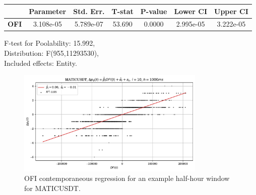 \begin{table}
\begin{center}
\begin{tabular}{lclc}
\hline
\end{tabular}
\begin{tabular}{lcccccc}
             & \textbf{Parameter} & \textbf{Std. Err.} & \textbf{T-stat} & \textbf{P-value} & \textbf{Lower CI} & \textbf{Upper CI}  \\
\hline
\textbf{OFI} &     3.108e-05      &     5.789e-07      &      53.690     &      0.0000      &     2.995e-05     &     3.222e-05      \\
\hline
\end{tabular}
\end{center}
F-test for Poolability: 15.992, \\
Distribution: F(955,11293530), \\
Included effects: Entity.
\end{table}

\begin{figure}[htpb]
    \centering
    \includegraphics[width=0.8\textwidth]{./images/maticusdt_h=1000ms_contemp_OFI.pdf}
    \caption{OFI contemporaneous regression for an example half-hour window for MATICUSDT.}
    \label{fig:contemp_OFI_maticusdt}
\end{figure}

